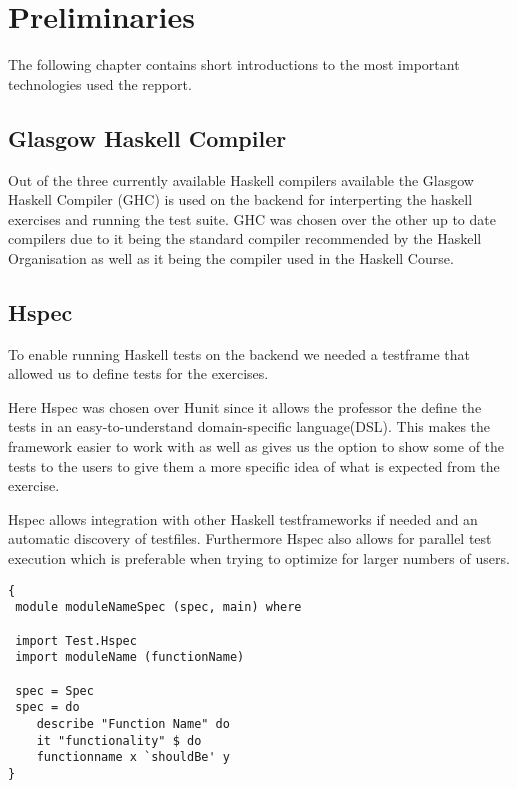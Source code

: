 \chapter{Preliminaries}
The following chapter contains short introductions to the most important technologies used the repport. 

\section{Glasgow Haskell Compiler} %
Out of the three currently available Haskell compilers available the Glasgow Haskell Compiler (GHC) is used on the backend for interperting the haskell exercises and running the test suite. GHC was chosen over the other up to date compilers due to it being the standard compiler recommended by the Haskell Organisation \cite{} as well as it being the compiler used in the Haskell Course. 

\section{Hspec}
To enable running Haskell tests on the backend we needed a testframe that allowed us to define tests for the exercises. 

Here Hspec was chosen over Hunit since it allows the professor the define the tests in an easy-to-understand domain-specific language(DSL). 
This makes the framework easier to work with as well as gives us the option to show some of the tests to the users to give them a more specific idea of what is expected from the exercise.

Hspec allows integration with other Haskell testframeworks if needed and an automatic discovery of testfiles. 
Furthermore Hspec also allows for parallel test execution which is preferable when trying to optimize for larger numbers of users. 

\begin{lstlisting}[language=CSharp, caption={An example of a Hspec Test.}, label={lst:HspecTestExample}]
{
 module moduleNameSpec (spec, main) where

 import Test.Hspec
 import moduleName (functionName)
 
 spec = Spec
 spec = do
 	describe "Function Name" do
 	it "functionality" $ do
	functionname x `shouldBe' y
}
\end{lstlisting}

